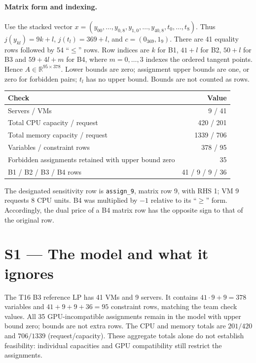 \documentclass[10pt]{article}
\begin{document}
\paragraph{Matrix form and indexing.}
Use the stacked vector $x=(y_{00},\ldots,y_{0,8},y_{1,0},\ldots,y_{40,8},t_0,\ldots,t_8)$.
Thus $j(y_{kl})=9k+l$, $j(t_l)=369+l$, and
$c=(0_{369},1_9)$. There are 41 equality rows followed by 54
``$\le$'' rows. Row indices are $k$ for B1, $41+l$ for B2,
$50+l$ for B3 and $59+4l+m$ for B4, where $m=0,\ldots,3$
indexes the ordered tangent points.
Hence $A\in\mathbb R^{95\times378}$. Lower bounds are zero;
assignment upper bounds are one, or zero for forbidden pairs;
$t_l$ has no upper bound. Bounds are not counted as rows.
\begin{center}\begin{tabular}{lr}\toprule
Check & Value\\\midrule
Servers / VMs & 9 / 41\\
Total CPU capacity / request & 420 / 201\\
Total memory capacity / request & 1339 / 706\\
Variables / constraint rows & 378 / 95\\
Forbidden assignments retained with upper bound zero & 35\\
B1 / B2 / B3 / B4 rows & 41 / 9 / 9 / 36\\\bottomrule
\end{tabular}\end{center}
The designated sensitivity row is \texttt{assign\_9}, matrix row 9,
with RHS 1; VM 9 requests 8 CPU units. B4 was multiplied by $-1$
relative to its ``$\ge$'' form. Accordingly, the dual price of a B4
matrix row has the opposite sign to that of the original row.

\newpage
\section*{S1 --- The model and what it ignores}
The T16 B3 reference LP has 41 VMs and 9 servers. It contains
$41\cdot9+9=378$ variables and $41+9+9+36=95$ constraint rows,
matching the team check values. All 35 GPU-incompatible assignments
remain in the model with upper bound zero; bounds are not extra rows.
The CPU and memory totals are $201/420$ and $706/1339$ (request/capacity).
These aggregate totals alone do not establish feasibility: individual
capacities and GPU compatibility still restrict the assignments.
\end{document}
